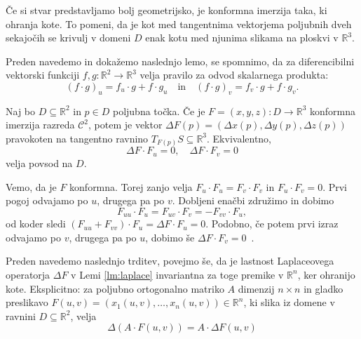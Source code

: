\documentclass[fin1, tisk, bibtex]{fmfdelo}
\begin{document}
Če si stvar predstavljamo bolj geometrijsko, je konformna imerzija taka, ki \glqq ohranja kote\grqq{}. To pomeni, da je kot med tangentnima vektorjema poljubnih dveh sekajočih se krivulj v domeni $D$ enak kotu med njunima slikama na ploskvi v $\mathbb{R}^3$.

Preden navedemo in dokažemo naslednjo lemo, se spomnimo, da za diferencibilni vektorski funkciji $f, g: \mathbb{R}^2 \rightarrow \mathbb{R}^3$ velja pravilo za odvod skalarnega produkta:
\begin{equation*}
    (f \cdot g)_u = f_u \cdot g + f \cdot g_u \quad \text{in} \quad (f \cdot g)_v = f_v \cdot g + f \cdot g_v.
\end{equation*}

\begin{lema}\label{lm:laplace}
	Naj bo $D \subseteq \mathbb{R}^2$ in $p \in D$ poljubna točka. Če je $F=\left(x, y, z\right): D \rightarrow \mathbb{R}^3$ konformna imerzija razreda $\mathcal{C}^2$, potem je vektor $\Delta F(p)=\left(\Delta x(p), \Delta y(p), \Delta z(p)\right)$ pravokoten na tangentno ravnino $T_{F(p)}S \subseteq \mathbb{R}^3$. Ekvivalentno,
    \begin{equation}
        \Delta F \cdot F_u =0, \quad \Delta F \cdot F_v = 0 \label{eq:lema_konformnost}
    \end{equation}
    velja povsod na $D$. 
\end{lema}

\begin{dokaz}
    Vemo, da je $F$ konformna. Torej zanjo velja $F_u \cdot F_u=F_v \cdot F_v$ in $F_u \cdot F_v=0$. Prvi pogoj odvajamo po $u$, drugega pa po $v$. Dobljeni enačbi združimo in dobimo  
    \begin{equation*}
        F_{u u} \cdot F_u=F_{u v} \cdot F_v=-F_{v v} \cdot F_u,
    \end{equation*}
    od koder sledi $\left(F_{u u}+F_{v v}\right) \cdot F_u=\Delta F \cdot F_u=0$. Podobno, če potem prvi izraz odvajamo po $v$, drugega pa po $u$, dobimo še $\Delta F \cdot F_v=0$~\cite[str.~8]{fosternicmin}. 
\end{dokaz}

Preden navedemo naslednjo trditev, povejmo še, da je lastnost Laplaceovega operatorja $\Delta F$ v Lemi \ref{lm:laplace} invariantna za toge premike v $\mathbb{R}^n$, ker ohranijo kote. Eksplicitno: za poljubno ortogonalno matriko $A$ dimenzij $n \times n$  in gladko preslikavo $F(u, v)=\left(x_1(u, v), \ldots, x_n(u, v)\right) \in \mathbb{R}^n$, ki slika iz domene v ravnini $D \subseteq\mathbb{R}^2$, velja
\begin{equation}
    \Delta(A \cdot F(u, v))=A \cdot \Delta F(u, v) \label{eq:laplace}
\end{equation}
\end{document}
